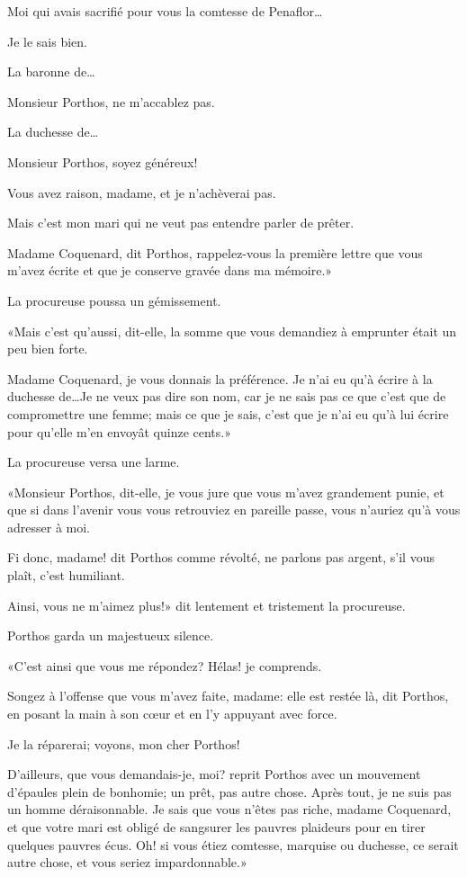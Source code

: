 \speak  Moi qui avais sacrifié pour vous la comtesse de Penaflor\dots 

\speak  Je le sais bien. 

\speak  La baronne de\dots 

\speak  Monsieur Porthos, ne m'accablez pas. 

\speak  La duchesse de\dots 

\speak  Monsieur Porthos, soyez généreux! 

\speak  Vous avez raison, madame, et je n'achèverai pas. 

\speak  Mais c'est mon mari qui ne veut pas entendre parler de prêter. 

\speak  Madame Coquenard, dit Porthos, rappelez-vous la première lettre que vous m'avez écrite et que je conserve gravée dans ma mémoire.» 

La procureuse poussa un gémissement. 

«Mais c'est qu'aussi, dit-elle, la somme que vous demandiez à emprunter était un peu bien forte. 

\speak  Madame Coquenard, je vous donnais la préférence. Je n'ai eu qu'à écrire à la duchesse de\dots Je ne veux pas dire son nom, car je ne sais pas ce que c'est que de compromettre une femme; mais ce que je sais, c'est que je n'ai eu qu'à lui écrire pour qu'elle m'en envoyât quinze cents.» 

La procureuse versa une larme. 

«Monsieur Porthos, dit-elle, je vous jure que vous m'avez grandement punie, et que si dans l'avenir vous vous retrouviez en pareille passe, vous n'auriez qu'à vous adresser à moi. 

\speak  Fi donc, madame! dit Porthos comme révolté, ne parlons pas argent, s'il vous plaît, c'est humiliant. 

\speak  Ainsi, vous ne m'aimez plus!» dit lentement et tristement la procureuse. 

Porthos garda un majestueux silence. 

«C'est ainsi que vous me répondez? Hélas! je comprends. 

\speak  Songez à l'offense que vous m'avez faite, madame: elle est restée là, dit Porthos, en posant la main à son cœur et en l'y appuyant avec force. 

\speak  Je la réparerai; voyons, mon cher Porthos! 

\speak  D'ailleurs, que vous demandais-je, moi? reprit Porthos avec un mouvement d'épaules plein de bonhomie; un prêt, pas autre chose. Après tout, je ne suis pas un homme déraisonnable. Je sais que vous n'êtes pas riche, madame Coquenard, et que votre mari est obligé de sangsurer les pauvres plaideurs pour en tirer quelques pauvres écus. Oh! si vous étiez comtesse, marquise ou duchesse, ce serait autre chose, et vous seriez impardonnable.» 

